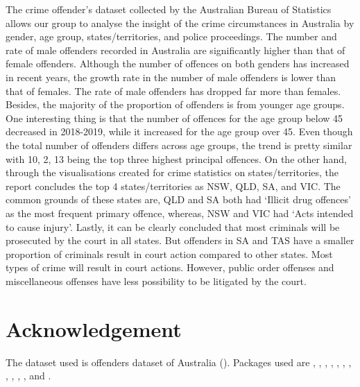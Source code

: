 \documentclass[11pt,a4paper,]{article}
\begin{document}
The crime offender's dataset collected by the Australian Bureau of Statistics allows our group to analyse the insight of the crime circumstances in Australia by gender, age group, states/territories, and police proceedings. The number and rate of male offenders recorded in Australia are significantly higher than that of female offenders. Although the number of offences on both genders has increased in recent years, the growth rate in the number of male offenders is lower than that of females. The rate of male offenders has dropped far more than females. Besides, the majority of the proportion of offenders is from younger age groups. One interesting thing is that the number of offences for the age group below 45 decreased in 2018-2019, while it increased for the age group over 45. Even though the total number of offenders differs across age groups, the trend is pretty similar with 10, 2, 13 being the top three highest principal offences. On the other hand, through the visualisations created for crime statistics on states/territories, the report concludes the top 4 states/territories as NSW, QLD, SA, and VIC. The common grounds of these states are, QLD and SA both had `Illicit drug offences' as the most frequent primary offence, whereas, NSW and VIC had `Acts intended to cause injury'. Lastly, it can be clearly concluded that most criminals will be prosecuted by the court in all states. But offenders in SA and TAS have a smaller proportion of criminals result in court action compared to other states. Most types of crime will result in court actions. However, public order offenses and miscellaneous offenses have less possibility to be litigated by the court.

\hypertarget{acknowledgement}{%
\section{Acknowledgement}\label{acknowledgement}}

The dataset used is offenders dataset of Australia (\textcite{ABS}).
Packages used are \textcite{ggplot2}, \textcite{tidyverse}, \textcite{tinytex}, \textcite{float}, \textcite{lubridate}, \textcite{readxl}, \textcite{kable}, \textcite{bookdown}, \textcite{gridExtra}, \textcite{here}, \textcite{dplyr}, and \textcite{readr}.

\newpage

\printbibliography[title=Reference]
\end{document}

